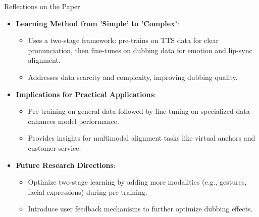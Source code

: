 \begin{frame}{Reflections on the Paper}
\begin{itemize}
    \item \textbf{Learning Method from 'Simple' to 'Complex'}:
    \begin{itemize}
        \item Uses a two-stage framework: pre-trains on TTS data for clear pronunciation, then fine-tunes on dubbing data for emotion and lip-sync alignment.
        \item Addresses data scarcity and complexity, improving dubbing quality.
    \end{itemize}
    \item \textbf{Implications for Practical Applications}:
    \begin{itemize}
        \item Pre-training on general data followed by fine-tuning on specialized data enhances model performance.
        \item Provides insights for multimodal alignment tasks like virtual anchors and customer service.
    \end{itemize}
    \item \textbf{Future Research Directions}:
    \begin{itemize}
        \item Optimize two-stage learning by adding more modalities (e.g., gestures, facial expressions) during pre-training.
        \item Introduce user feedback mechanisms to further optimize dubbing effects.
    \end{itemize}
\end{itemize}
\end{frame}
